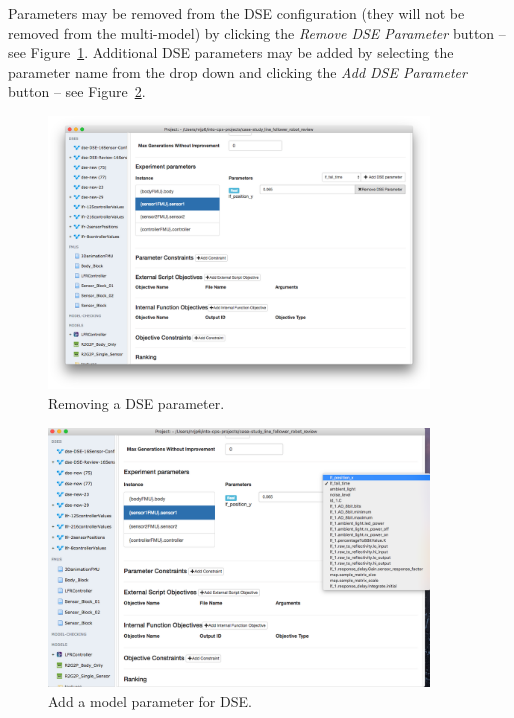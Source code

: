 Parameters may be removed from the DSE configuration (they will not be removed from the multi-model) by clicking the \textit{Remove DSE Parameter} button -- see Figure~\ref{fig:dse:edit:app-param-remove}. Additional DSE parameters may be added by selecting the parameter name from the drop down and clicking the \textit{Add DSE Parameter} button -- see Figure~\ref{fig:dse:edit:app-param-add}.

\begin{figure}[ht]
	\centering
	\includegraphics[width=0.9\textwidth]{figures/dse/app-param-remove}
	\caption{Removing a DSE parameter.}\label{fig:dse:edit:app-param-remove}
\end{figure}
%
%
%
\begin{figure}[ht]
	\centering
	\includegraphics[width=0.9\textwidth]{figures/dse/app-param-add}
	\caption{Add a model parameter for DSE.}\label{fig:dse:edit:app-param-add}
\end{figure}
\clearpage
%
%
%

